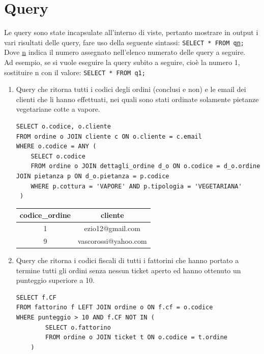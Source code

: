 \documentclass[10pt]{article}
\begin{document}
	\section{Query}
	\begin{framed}
\noindent Le query sono state incapsulate all'interno di viste, pertanto mostrare in output i vari risultati delle query, fare uso della seguente sintassi:
\texttt{SELECT * FROM q\underline{n};} \\Dove \underline{n} indica il numero assegnato nell'elenco numerato delle query a seguire.\\Ad esempio, se si vuole eseguire la query subito a seguire, cio\`e la numero 1, sostituire n con il valore: \texttt{SELECT * FROM q1;}
    \end{framed}
	\begin{enumerate}[noitemsep]
		\item Query che ritorna tutti i codici degli ordini (conclusi e non) e le email dei clienti che li hanno effettuati, nei quali sono stati ordinate solamente pietanze vegetariane cotte a vapore.
\begin{lstlisting}[style=Mysql]
SELECT o.codice, o.cliente
FROM ordine o JOIN cliente c ON o.cliente = c.email 
WHERE o.codice = ANY (
	SELECT o.codice
	FROM ordine o JOIN dettagli_ordine d_o ON o.codice = d_o.ordine JOIN pietanza p ON d_o.pietanza = p.codice
	WHERE p.cottura = 'VAPORE' AND p.tipologia = 'VEGETARIANA'
 )
\end{lstlisting}
	\begin{table}[ht]
	\centering
		\label{table:query4}
		\begin{tabular}{|c|c|}
			\hline
			\multirow{1}{*}{\textbf{codice\_ordine}} & \multicolumn{1}{c|}{\textbf{cliente}}\\
			\hline
			1 & ezio12@gmail.com\\ \hline
			9 & vascorossi@yahoo.com\\ \hline
			\end{tabular}
	\end{table}
	\item Query che ritorna i codici fiscali di tutti i fattorini che hanno portato a termine tutti gli ordini senza nessun ticket aperto ed hanno ottenuto un punteggio superiore a 10.
\begin{lstlisting}[style=Mysql]
SELECT f.CF
FROM fattorino f LEFT JOIN ordine o ON f.cf = o.codice 
WHERE punteggio > 10 AND f.CF NOT IN (
    	SELECT o.fattorino
    	FROM ordine o JOIN ticket t ON o.codice = t.ordine
    )
\end{lstlisting}	

\end{enumerate}
\end{document}
